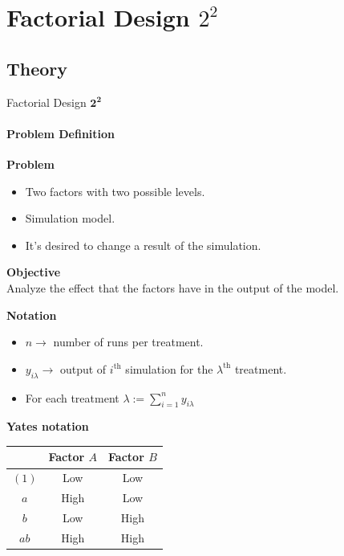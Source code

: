 \section{Factorial Design $2^2$}
\subsection{Theory}
\begin{frame}{Factorial Design $\pmb{2^2}$}
\framesubtitle{Problem Definition}

\begin{multicols}{2}
\textbf{Problem}
\begin{itemize}
    \item Two factors with two possible levels. \pause
    \item Simulation model.\pause
    \item It's desired to change a result of the simulation.
\end{itemize}

\columnbreak
\pause
\textbf{Objective}\\ \vspace{0.1cm} Analyze the effect that the factors have in the output of the model.
\end{multicols}
\pause
\begin{multicols}{2}
\textbf{Notation}
\begin{itemize}
    \item $n \rightarrow$ number of runs per treatment.
    \item $y_{i\lambda} \rightarrow$ output of $i^{\text{th}}$ simulation for the $\lambda^{\text{th}}$ treatment. 
    \item For each treatment $\lambda := \sum_{i=1}^n y_{i\lambda}$
\end{itemize}

\columnbreak
\centering
\textbf{Yates notation}
\begin{table}[]
\centering
\begin{tabular}{ccc}
\hline
      & Factor $A$ & Factor $B$ \\ \hline
$(1)$ & Low        & Low        \\
$a$   & High       & Low        \\
$b$   & Low        & High       \\
$ab$  & High       & High       \\ \hline
\end{tabular}
\label{tab:yates}
\end{table}
\end{multicols}
\end{frame}


